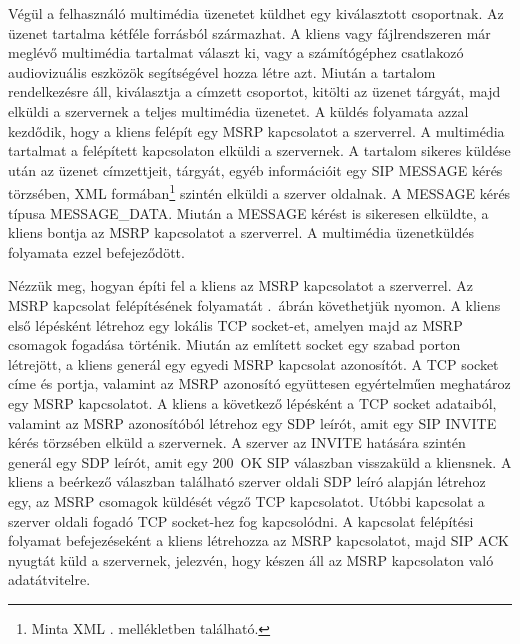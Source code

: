 Végül a felhasználó multimédia üzenetet küldhet egy kiválasztott csoportnak. Az üzenet tartalma kétféle forrásból származhat. A kliens vagy fájlrendszeren már meglévő multimédia tartalmat választ ki, vagy a számítógéphez csatlakozó audiovizuális eszközök segítségével hozza létre azt. Miután a tartalom rendelkezésre áll, kiválasztja a címzett csoportot, kitölti az üzenet tárgyát, majd elküldi a szervernek a teljes multimédia üzenetet. A küldés folyamata azzal kezdődik, hogy a kliens felépít egy MSRP kapcsolatot a szerverrel. A multimédia tartalmat a felépített kapcsolaton elküldi a szervernek. A tartalom sikeres küldése után az üzenet címzettjeit, tárgyát, egyéb információit egy SIP MESSAGE kérés törzsében, XML formában\footnote{Minta XML . mellékletben található.} szintén elküldi a szerver oldalnak. A MESSAGE kérés típusa MESSAGE\_DATA. Miután a MESSAGE kérést is sikeresen elküldte, a kliens bontja az MSRP kapcsolatot a szerverrel. A multimédia üzenetküldés folyamata ezzel befejeződött.

\medskip
Nézzük meg, hogyan építi fel a kliens az MSRP kapcsolatot a szerverrel. Az MSRP kapcsolat felépítésének folyamatát .~ábrán követhetjük nyomon. A kliens első lépésként létrehoz egy lokális TCP socket-et, amelyen majd az MSRP csomagok fogadása történik. Miután az említett socket egy szabad porton létrejött, a kliens generál egy egyedi MSRP kapcsolat azonosítót. A TCP socket címe és portja, valamint az MSRP azonosító együttesen egyértelműen meghatároz egy MSRP kapcsolatot. A kliens a következő lépésként a TCP socket adataiból, valamint az MSRP azonosítóból létrehoz egy SDP leírót, amit egy SIP INVITE kérés törzsében elküld a szervernek. A szerver az INVITE hatására szintén generál egy SDP leírót, amit egy 200~OK SIP válaszban visszaküld a kliensnek. A kliens a beérkező válaszban található szerver oldali SDP leíró alapján létrehoz egy, az MSRP csomagok küldését végző TCP kapcsolatot. Utóbbi kapcsolat a szerver oldali fogadó TCP socket-hez fog kapcsolódni. A kapcsolat felépítési folyamat befejezéseként a kliens létrehozza az MSRP kapcsolatot, majd SIP ACK nyugtát küld a szervernek, jelezvén, hogy készen áll az MSRP kapcsolaton való adatátvitelre.

